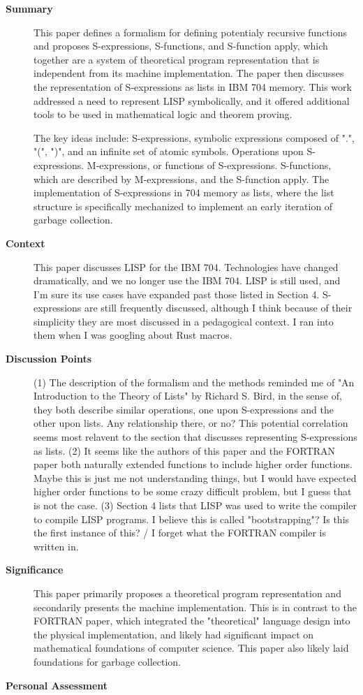 \begin{description}
    \item[\textbf{Summary}]
    This paper defines a formalism for defining potentialy recursive functions
    and proposes S-expressions, S-functions, and S-function apply, which
    together are a system of theoretical program representation that is
    independent from its machine implementation. The paper then discusses the
    representation of S-expressions as lists in IBM 704 memory. This work
    addressed a need to represent LISP symbolically, and it offered additional
    tools to be used in mathematical logic and theorem proving.

    The key ideas include: S-expressions, symbolic expressions composed of ".",
    "(", ")", and an infinite set of atomic symbols. Operations upon
    S-expressions. M-expressions, or functions of S-expressions. S-functions,
    which are described by M-expressions, and the S-function apply. The
    implementation of S-expressions in 704 memory as lists, where the list
    structure is specifically mechanized to implement an early iteration of
    garbage collection.
    \item[\textbf{Context}]
    This paper discusses LISP for the IBM 704. Technologies have changed
    dramatically, and we no longer use the IBM 704. LISP is still used, and I'm
    sure its use cases have expanded past those listed in Section 4.
    S-expressions are still frequently discussed, although I think because of
    their simplicity they are most discussed in a pedagogical context. I ran
    into them when I was googling about Rust macros.
    \item[\textbf{Discussion Points}]
    (1) The description of the formalism and the methods reminded me of "An
    Introduction to the Theory of Lists" by Richard S. Bird, in the sense of,
    they both describe similar operations, one upon S-expressions and the other
    upon lists. Any relationship there, or no? This potential correlation seems
    most relavent to the section that discusses representing S-expressions as
    lists. (2) It seems like the authors of this paper and the FORTRAN paper
    both naturally extended functions to include higher order functions. Maybe
    this is just me not understanding things, but I would have expected higher
    order functions to be some crazy difficult problem, but I guess that is not
    the case. (3) Section 4 lists that LISP was used to write the compiler to
    compile LISP programs. I believe this is called "bootstrapping"? Is this the
    first instance of this? / I forget what the FORTRAN compiler is written in.
    \item[\textbf{Significance}]
    This paper primarily proposes a theoretical program representation and
    secondarily presents the machine implementation. This is in contrast to the
    FORTRAN paper, which integrated the "theoretical" language design into the
    physical implementation, and likely had significant impact on mathematical
    foundations of computer science. This paper also likely laid foundations for
    garbage collection.
    \item[\textbf{Personal Assessment}]
\end{description}

